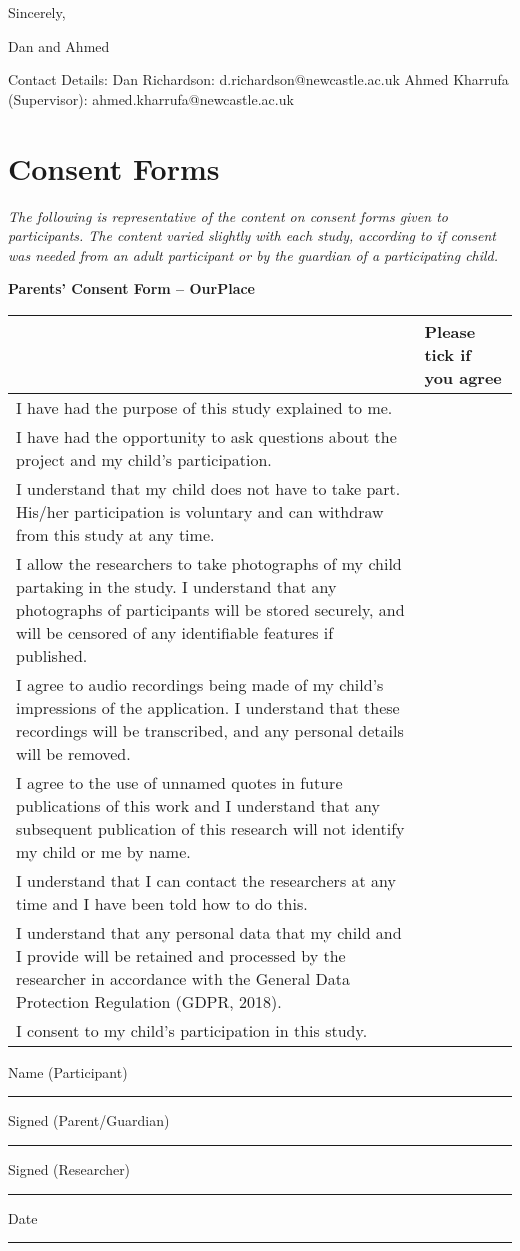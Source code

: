 \vspace{5mm}

Sincerely, 

Dan and Ahmed 

\vspace{5mm}

Contact Details:
Dan Richardson: d.richardson@newcastle.ac.uk 
Ahmed Kharrufa (Supervisor): ahmed.kharrufa@newcastle.ac.uk 

\newpage
\section{Consent Forms}
\label{app:consentForms}

\textit{The following is representative of the content on consent forms given to participants. The content varied slightly with each study, according to if consent was needed from an adult participant or by the guardian of a participating child.}

\vspace{5mm}

\textbf{Parents' Consent Form -- OurPlace}

\vspace{5mm}

{ \RaggedRight
\begin{tabularx}{\linewidth}{ | X | p{30mm} |} 
 \hline
  & Please tick if you agree \\ 
  \hline
 I have had the purpose of this study explained to me. &  \\ 
 \hline
 I have had the opportunity to ask questions about the project and my child’s participation. &  \\ 
 \hline
 I understand that my child does not have to take part. His/her participation is voluntary and can withdraw from this study at any time. & \\
 \hline
 I allow the researchers to take photographs of my child partaking in the study. I understand that any photographs of participants will be stored securely, and will be censored of any identifiable features if published. & \\
 \hline
 I agree to audio recordings being made of my child’s impressions of the application. I understand that these recordings will be transcribed, and any personal details will be removed. & \\
 \hline
 I agree to the use of unnamed quotes in future publications of this work and I understand that any subsequent publication of this research will not identify my child or me by name.   & \\
  \hline
I understand that I can contact the researchers at any time and I have been told how to do this. & \\
  \hline
I understand that any personal data that my child and I provide will be retained and processed by the researcher in accordance with the General Data Protection Regulation (GDPR, 2018). & \\
  \hline
I consent to my child’s participation in this study.  & \\
 \hline
\end{tabularx}
}

\vspace{5mm}

Name (Participant) \rule{5cm}{0.15mm}

Signed (Parent/Guardian) \rule{5cm}{0.15mm}

Signed (Researcher) \rule{3cm}{0.15mm} Date \rule{2cm}{0.15mm}

